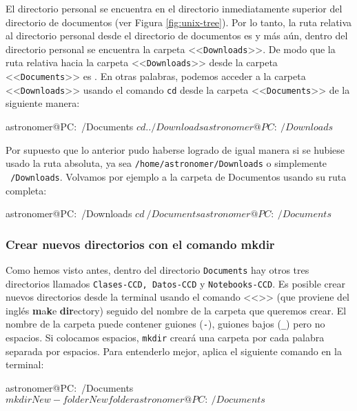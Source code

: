 
El directorio personal se encuentra en el directorio inmediatamente superior del directorio de documentos (ver Figura \ref{fig:unix-tree}). Por lo tanto, la ruta relativa al directorio personal desde el directorio de documentos es  y más aún, dentro del directorio personal se encuentra la carpeta <<\texttt{Downloads}>>. De modo que la ruta relativa hacia la carpeta <<\texttt{Downloads}>> desde la carpeta <<\texttt{Documents}>> es . En otras palabras, podemos acceder a la carpeta <<\texttt{Downloads}>> usando el comando \texttt{cd} desde la carpeta <<\texttt{Documents}>> de la siguiente manera:

\begin{bash}
astronomer@PC:~/Documents $ cd ../Downloads
astronomer@PC:~/Downloads $
\end{bash}

Por supuesto que lo anterior pudo haberse logrado de igual manera si se hubiese usado la ruta absoluta, ya sea \texttt{/home/astronomer/Downloads} o simplemente \texttt{~/Downloads}. Volvamos por ejemplo a la carpeta de Documentos usando su ruta completa:
\begin{bash}
astronomer@PC:~/Downloads $ cd ~/Documents 
astronomer@PC:~/Documents $
\end{bash}

\subsubsection{Crear nuevos directorios con el comando mkdir}
Como hemos visto antes, dentro del directorio \texttt{Documents} hay otros tres directorios llamados \texttt{Clases-CCD,  Datos-CCD} y \texttt{Notebooks-CCD}. Es posible crear nuevos directorios desde la terminal usando el comando <<>> (que proviene del inglés \textbf{m}a\textbf{k}e \textbf{dir}ectory) seguido del nombre de la carpeta que queremos crear. El nombre de la carpeta puede contener guiones (\texttt{-}), guiones bajos (\texttt{_}) pero no espacios. Si colocamos espacios, \texttt{mkdir} creará una carpeta por cada palabra separada por espacios. Para entenderlo mejor, aplica el siguiente comando en la terminal:

\begin{bash}
astronomer@PC:~/Documents $ mkdir New-folder New folder
astronomer@PC:~/Documents $ 
\end{bash}

